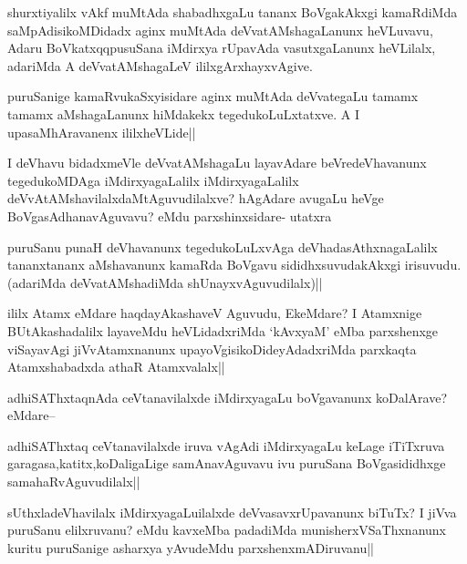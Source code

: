 \begin{artha}
shurxtiyalilx vAkf muMtAda shabadhxgaLu tananx BoVgakAkxgi kamaRdiMda saMpAdisikoMDidadx aginx muMtAda deVvatAMshagaLanunx heVLuvavu, Adaru BoVkatxqqpusuSana iMdirxya rUpavAda vasutxgaLanunx heVLilalx, adariMda A deVvatAMshagaLeV ililxgArxhayxvAgive.
\end{artha}

\begin{artha}
puruSanige kamaRvukaSxyisidare aginx muMtAda deVvategaLu tamamx tamamx aMshagaLanunx hiMdakekx tegedukoLuLxtatxve. A I upasaMhAravanenx ililxheVLide||
\end{artha}

\begin{artha}
I deVhavu bidadxmeVle deVvatAMshagaLu layavAdare beVredeVhavanunx tegedukoMDAga iMdirxyagaLalilx iMdirxyagaLalilx deVvAtAMshavilalxdaMtAguvudilalxve? hAgAdare avugaLu heVge BoVgasAdhanavAguvavu? eMdu parxshinxsidare- utatxra 
\end{artha}

\begin{artha}
puruSanu punaH deVhavanunx tegedukoLuLxvAga deVhadasAthxnagaLalilx tananxtananx aMshavanunx kamaRda BoVgavu sididhxsuvudakAkxgi irisuvudu.(adariMda deVvatAMshadiMda shUnayxvAguvudilalx)||
\end{artha}


\begin{artha}
ililx Atamx eMdare haqdayAkashaveV Aguvudu, EkeMdare? I Atamxnige BUtAkashadalilx layaveMdu heVLidadxriMda `kAvxyaM' eMba parxshenxge viSayavAgi jiVvAtamxnanunx upayoVgisikoDideyAdadxriMda parxkaqta Atamxshabadxda athaR Atamxvalalx||
\end{artha}

\begin{artha}
adhiSAThxtaqnAda ceVtanavilalxde iMdirxyagaLu boVgavanunx koDalArave? eMdare--
\end{artha}

\begin{artha}
adhiSAThxtaq ceVtanavilalxde iruva vAgAdi iMdirxyagaLu keLage iTiTxruva garagasa,katitx,koDaligaLige samAnavAguvavu  ivu puruSana BoVgasididhxge samahaRvAguvudilalx||
\end{artha}


\begin{artha}
sUthxladeVhavilalx iMdirxyagaLuilalxde deVvasavxrUpavanunx biTuTx? I jiVva puruSanu elilxruvanu? eMdu kavxeMba padadiMda munisherxVSaThxnanunx kuritu puruSanige asharxya yAvudeMdu parxshenxmADiruvanu||
\end{artha}

